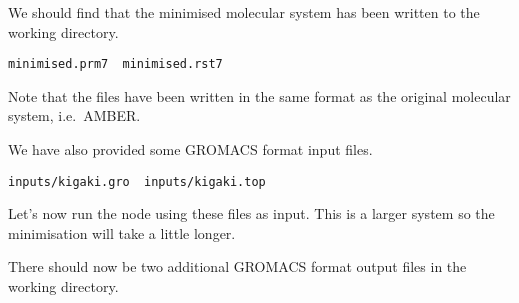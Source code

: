 \begin{Shaded}
\begin{Highlighting}[]
\OperatorTok{/}\OperatorTok{--}\OperatorTok{=} \OperatorTok{--}\OperatorTok{/}\OperatorTok{*}
\end{Highlighting}
\end{Shaded}

We should find that the minimised molecular system has been written to
the working directory.

\begin{Shaded}
\begin{Highlighting}[]
\OperatorTok{*}
\end{Highlighting}
\end{Shaded}

\begin{verbatim}
minimised.prm7  minimised.rst7
\end{verbatim}

Note that the files have been written in the same format as the original
molecular system, i.e.~AMBER.

We have also provided some GROMACS format input files.

\begin{Shaded}
\begin{Highlighting}[]
\OperatorTok{/}\OperatorTok{*}
\end{Highlighting}
\end{Shaded}

\begin{verbatim}
inputs/kigaki.gro  inputs/kigaki.top
\end{verbatim}

Let's now run the node using these files as input. This is a larger
system so the minimisation will take a little longer.

\begin{Shaded}
\begin{Highlighting}[]
\OperatorTok{/}\OperatorTok{--}\OperatorTok{=} \OperatorTok{--}\OperatorTok{/}\OperatorTok{*}
\end{Highlighting}
\end{Shaded}

There should now be two additional GROMACS format output files in the
working directory.

